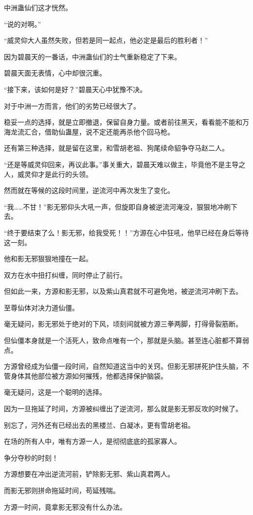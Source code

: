 \begin{this_body}
中洲蛊仙们这才恍然。

“说的对啊。”

“威灵仰大人虽然失败，但若是同一起点，他必定是最后的胜利者！”

因为碧晨天的一番话，中洲蛊仙们的士气重新稳定了下来。

碧晨天面无表情，心中却很沉重。

“接下来，该如何是好？”碧晨天心中犹豫不决。

对于中洲一方而言，他们的劣势已经很大了。

稳妥一点的选择，就是立即撤退，保留自身力量。或者前往黑天，看看能不能和万海龙流汇合，借助仙蛊屋，说不定还能再杀他个回马枪。

还有第三种选择，就是留在这里，和雪胡老祖、狗尾续命貂争夺马赵二人。

“还是等威灵仰回来，再议此事。”事关重大，碧晨天难以做主，毕竟他不是主导之人，威灵仰才是此行的头领。

然而就在等候的这段时间里，逆流河中再次发生了变化。

“我……不甘！”影无邪仰头大吼一声，但旋即自身被逆流河淹没，狠狠地冲刷下去。

“终于要结束了么！影无邪，给我受死！！”方源在心中狂吼，他早已经在身后等待这一刻。

他和影无邪狠狠地撞在一起。

双方在水中扭打纠缠，同时停止了前行。

但如此一来，方源和影无邪，以及紫山真君就不可避免地，被逆流河冲刷下去。

至尊仙体对决力道仙僵。

毫无疑问，影无邪处于绝对的下风，顷刻间就被方源三拳两脚，打得骨裂筋断。

但仙僵本身就是一个活死人，致命点唯有一个，那就是头脑。甚至连心脏都不算弱点。

方源曾经成为仙僵一段时间，自然知道这当中的关窍。但影无邪拼死护住头脑，不管身体其他部位被方源如何摧残，他都选择保护脑袋。

毫无疑问，这是一个聪明的选择。

因为一旦拖延了时间，方源被纠缠出了逆流河，那么就是影无邪反攻的时候了。

别忘了，河外还有已经出去的黑楼兰、白凝冰，更有雪胡老祖。

在场的所有人中，唯有方源一人，是彻彻底底的孤家寡人。

争分夺秒的时刻！

方源想要在冲出逆流河前，铲除影无邪、紫山真君两人。

而影无邪则拼命拖延时间，苟延残喘。

方源一时间，竟拿影无邪没有什么办法。

\end{this_body}

